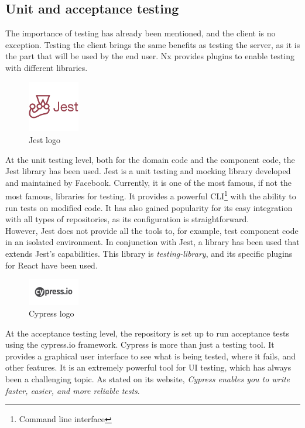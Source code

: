 \documentclass[../memory.tex]{subfiles}
\begin{document}
\subsection{Unit and acceptance testing}
The importance of testing has already been mentioned, and the client is no
exception. Testing the client brings the same benefits as testing the server, as
it is the part that will be used by the end user. Nx provides plugins to enable
testing with different libraries.
\begin{figure}[H]
	\centering
	\includegraphics[width=0.2\textwidth]{./assets/logos/jest-logo.png}
	\caption{Jest logo}
\end{figure}
At the unit testing level, both for the domain code and the component code, the
Jest library has been used. Jest is a unit testing and mocking library developed
and maintained by Facebook. Currently, it is one of the most famous, if not the
most famous, libraries for testing. It provides a powerful CLI\footnote{Command
	line interface} with the ability to run tests on modified code. It has also
gained popularity for its easy integration with all types of repositories, as
its configuration is straightforward.
\\
However, Jest does not provide all the tools to, for example, test component
code in an isolated environment. In conjunction with Jest, a library has been
used that extends Jest's capabilities. This library is \emph{testing-library},
and its specific plugins for React have been used.
\begin{figure}[H]
	\centering
	\includegraphics[width=0.2\textwidth]{./assets/logos/cypress-logo.png}
	\caption{Cypress logo}
\end{figure}
At the acceptance testing level, the repository is set up to run acceptance
tests using the cypress.io framework. Cypress is more than just a testing tool.
It provides a graphical user interface to see what is being tested, where it
fails, and other features. It is an extremely powerful tool for UI testing,
which has always been a challenging topic. As stated on its website,
\emph{Cypress enables you to write faster, easier, and more reliable
	tests}\cite{cypress}.
\end{document}
